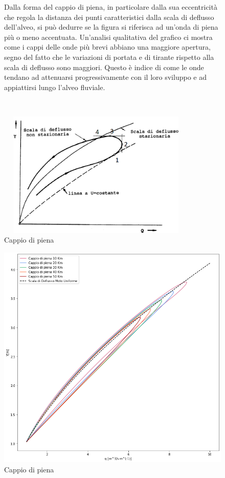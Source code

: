 \documentclass[12pt]{article} %
\begin{document}
\begin{figure}[H]
\begin{minipage}[b]{8.5cm}
\noindent Dalla forma del cappio di piena, in particolare dalla sua eccentricità che regola la distanza dei punti caratteristici dalla scala di deflusso dell'alveo, si può dedurre se la figura si riferisca ad un'onda di piena più o meno accentuata.
Un'analisi qualitativa del grafico ci mostra come i cappi delle onde più brevi abbiano una maggiore apertura, segno del fatto che le variazioni di portata e di tirante rispetto alla scala di deflusso sono maggiori. Questo è indice di come le onde tendano ad attenuarsi progressivamente con il loro sviluppo e ad appiattirsi lungo l'alveo fluviale.
\end{minipage}
\ \hspace{2mm} \hspace{3mm} \
\begin{minipage}[b]{10.5cm}
    \centering
    \includegraphics[height=6cm, width=9.5cm]{Punticappio.png}
    \caption{Cappio di piena}
    \label{fig:punti}
\end{minipage}
\end{figure}

\begin{figure} [H]
    \centering
    \includegraphics[scale=0.5,width=18cm]{Cappio.png}
    \caption{Cappio di piena}
    \label{fig:cappio}
\end{figure}
\end{document}
